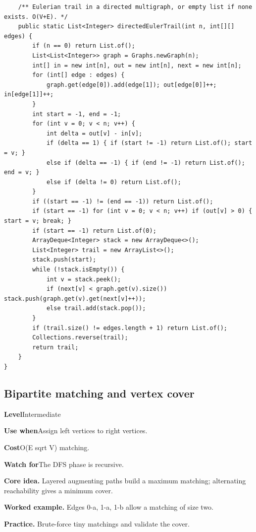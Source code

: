 \documentclass[10pt,letterpaper]{article}
\newcommand{\entrylabel}[1]{\textcolor{accent}{\bfseries #1}}
\begin{document}
\begin{lstlisting}
    /** Eulerian trail in a directed multigraph, or empty list if none exists. O(V+E). */
    public static List<Integer> directedEulerTrail(int n, int[][] edges) {
        if (n == 0) return List.of();
        List<List<Integer>> graph = Graphs.newGraph(n);
        int[] in = new int[n], out = new int[n], next = new int[n];
        for (int[] edge : edges) {
            graph.get(edge[0]).add(edge[1]); out[edge[0]]++; in[edge[1]]++;
        }
        int start = -1, end = -1;
        for (int v = 0; v < n; v++) {
            int delta = out[v] - in[v];
            if (delta == 1) { if (start != -1) return List.of(); start = v; }
            else if (delta == -1) { if (end != -1) return List.of(); end = v; }
            else if (delta != 0) return List.of();
        }
        if ((start == -1) != (end == -1)) return List.of();
        if (start == -1) for (int v = 0; v < n; v++) if (out[v] > 0) { start = v; break; }
        if (start == -1) return List.of(0);
        ArrayDeque<Integer> stack = new ArrayDeque<>();
        List<Integer> trail = new ArrayList<>();
        stack.push(start);
        while (!stack.isEmpty()) {
            int v = stack.peek();
            if (next[v] < graph.get(v).size()) stack.push(graph.get(v).get(next[v]++));
            else trail.add(stack.pop());
        }
        if (trail.size() != edges.length + 1) return List.of();
        Collections.reverse(trail);
        return trail;
    }
}
\end{lstlisting}
\subsection{Bipartite matching and vertex cover}
\begin{guidebox}\small
\entrylabel{Level}\quad Intermediate\par
\entrylabel{Use when}\quad Assign left vertices to right vertices.\par
\entrylabel{Cost}\quad O(E sqrt V) matching.\par
\entrylabel{Watch for}\quad The DFS phase is recursive.\par
\end{guidebox}
\noindent\textbf{Core idea.} Layered augmenting paths build a maximum matching; alternating reachability gives a minimum cover.\par
\noindent\textbf{Worked example.} Edges 0-a, 1-a, 1-b allow a matching of size two.\par
\noindent\textbf{Practice.} Brute-force tiny matchings and validate the cover.\par
\end{document}
